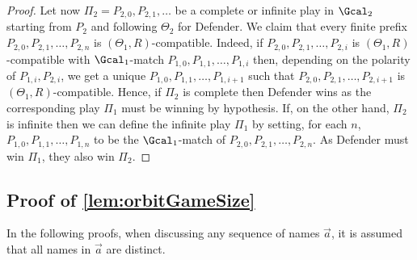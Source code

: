 \begin{proof}
Let now $\Pi_2=P_{2,0},P_{2,1},\dots$ be a complete or infinite play in $\Gcal_2$ starting from $P_2$ and following $\Theta_2$ for Defender. We claim that every finite prefix $P_{2,0},P_{2,1},\dots,P_{2,n}$ is $(\Theta_1,R)$-compatible. Indeed, if $P_{2,0},P_{2,1},\dots,P_{2,i}$ is $(\Theta_1,R)$-compatible with $\Gcal_1$-match $P_{1,0},P_{1,1},\dots,P_{1,i}$ then, depending on the polarity of $P_{1,i},P_{2,i}$, we get a unique  $P_{1,0},P_{1,1},\dots,P_{1,i+1}$ such that $P_{2,0},P_{2,1},\dots,P_{2,i+1}$ is $(\Theta_1,R)$-compatible. Hence, if $\Pi_2$ is complete then Defender wins as the corresponding play $\Pi_1$ must be winning by hypothesis. If, on the other hand, $\Pi_2$ is infinite then we can define the infinite play $\Pi_1$ by setting, for each $n$, $P_{1,0},P_{1,1},\dots,P_{1,n}$ to be the $\Gcal_1$-match of $P_{2,0},P_{2,1},\dots,P_{2,n}$. As Defender must win $\Pi_1$, they also win $\Pi_2$.
\end{proof}

\subsection{Proof of \cref{lem:orbitGameSize}}\label{app:orbitGameSize}









In the following proofs, when discussing any sequence of names $\vec a$, it is assumed that all names in $\vec a$ are distinct.


